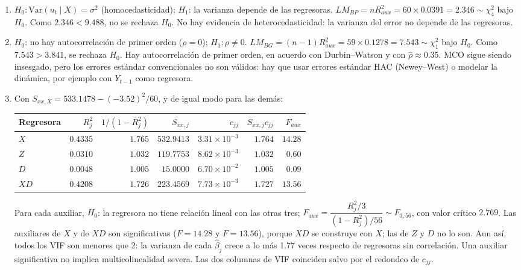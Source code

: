 \begin{solucion}
\begin{enumerate}
  \item $H_0:\mathrm{Var}(u_t\mid X)=\sigma^2$ (homocedasticidad); $H_1$: la varianza depende de las regresoras. $LM_{BP}=nR^2_{aux}=60\times0.0391=2.346\sim\chi^2_4$ bajo $H_0$. Como $2.346<9.488$, no se rechaza $H_0$. No hay evidencia de heterocedasticidad: la varianza del error no depende de las regresoras.
  \item $H_0$: no hay autocorrelación de primer orden ($\rho=0$); $H_1:\rho\neq0$. $LM_{BG}=(n-1)R^2_{aux}=59\times0.1278=7.543\sim\chi^2_1$ bajo $H_0$. Como $7.543>3.841$, se rechaza $H_0$. Hay autocorrelación de primer orden, en acuerdo con Durbin--Watson y con $\hat\rho\approx0.35$. MCO sigue siendo insesgado, pero los errores estándar convencionales no son válidos: hay que usar errores estándar HAC (Newey--West) o modelar la dinámica, por ejemplo con $Y_{t-1}$ como regresora.
  \item Con $S_{xx,X}=533.1478-(-3.52)^2/60$, y de igual modo para las demás:

  \begin{center}
  \begin{tabular}{@{}lrrrrrr@{}}
  \toprule
  Regresora & $R_j^2$ & $1/(1-R_j^2)$ & $S_{xx,j}$ & $c_{jj}$ & $S_{xx,j}c_{jj}$ & $F_{aux}$\\
  \midrule
  $X$ & $0.4335$ & $1.765$ & $532.9413$ & $3.31\times10^{-3}$ & $1.764$ & $14.28$\\
  $Z$ & $0.0310$ & $1.032$ & $119.7753$ & $8.62\times10^{-3}$ & $1.032$ & $0.60$\\
  $D$ & $0.0048$ & $1.005$ & $15.0000$ & $6.70\times10^{-2}$ & $1.005$ & $0.09$\\
  $XD$ & $0.4208$ & $1.726$ & $223.4569$ & $7.73\times10^{-3}$ & $1.727$ & $13.56$\\
  \bottomrule
  \end{tabular}
  \end{center}

  Para cada auxiliar, $H_0$: la regresora no tiene relación lineal con las otras tres; $F_{aux}=\dfrac{R_j^2/3}{(1-R_j^2)/56}\sim F_{3,56}$, con valor crítico $2.769$. Las auxiliares de $X$ y de $XD$ son significativas ($F=14.28$ y $F=13.56$), porque $XD$ se construye con $X$; las de $Z$ y $D$ no lo son. Aun así, todos los VIF son menores que 2: la varianza de cada $\hat\beta_j$ crece a lo más 1.77 veces respecto de regresoras sin correlación. Una auxiliar significativa no implica multicolinealidad severa. Las dos columnas de VIF coinciden salvo por el redondeo de $c_{jj}$.
\end{enumerate}
\end{solucion}


